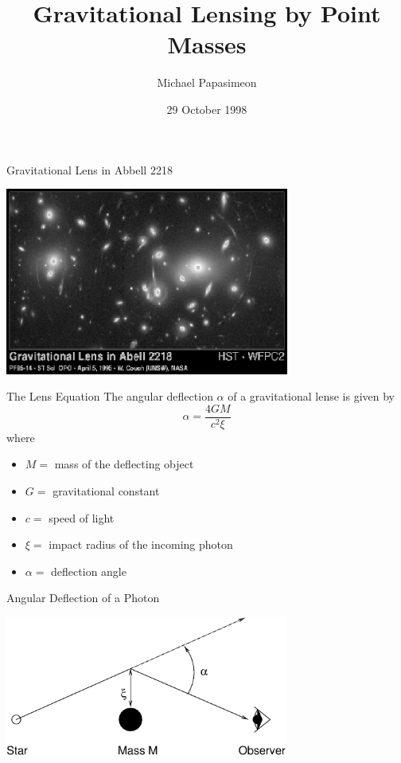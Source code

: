 \documentclass[aspectratio=1610,xcolor=dvipsnames,t]{beamer}
\title[Gravitational Lensing]{Gravitational Lensing by Point Masses}
\author{Michael Papasimeon}
\date{29 October 1998}
\begin{document}
\maketitle

\begin{frame}{Gravitational Lens in Abbell 2218} 
    \begin{center}
        \includegraphics[width=0.7\textwidth]{images/hubble.eps}
    \end{center}
\end{frame} 

\begin{frame}{The Lens Equation}
    The angular deflection $\alpha$ of a gravitational lense is given by
    \begin{equation}    
        \alpha = \frac{4GM}{c^2 \xi}
    \end{equation}
    where
    \begin{itemize}
        \item $M = $ mass of the deflecting object
        \item $G = $ gravitational constant
        \item $c = $ speed of light
        \item $\xi = $ impact radius of the incoming photon
        \item $\alpha = $ deflection angle
    \end{itemize}
\end{frame} 

\begin{frame}{Angular Deflection of a Photon} 
    \begin{center}
        \includegraphics[width=0.7\textwidth]{images/gldiag.eps}
    \end{center}
\end{frame} 
\end{document}
